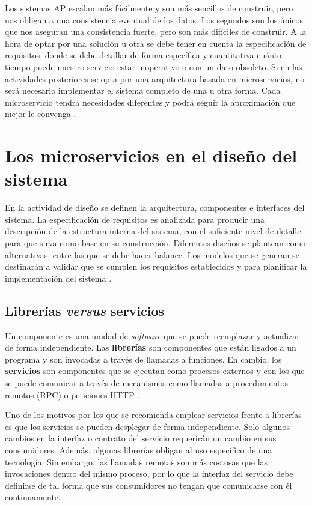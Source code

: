 \documentclass[11pt,spanish,listoffigures]{tfgetsinf}
\begin{document}
Los sistemas AP escalan más fácilmente y son más sencillos de construir, pero nos obligan a una consistencia eventual de los datos. Los segundos son los únicos que nos aseguran una consistencia fuerte, pero son más difíciles de construir. A la hora de optar por una solución u otra se debe tener en cuenta la especificación de requisitos, donde se debe detallar de forma específica y cuantitativa cuánto tiempo puede nuestro servicio estar inoperativo o con un dato obsoleto. Si en las actividades posteriores se opta por una arquitectura basada en microservicios, no será necesario implementar el sistema completo de una u otra forma. Cada microservicio tendrá necesidades diferentes y podrá seguir la aproximación que mejor le convenga \cite{Newman2015a}.

\section{Los microservicios en el diseño del sistema} \label{sct:FaseDiseño}

En la actividad de diseño se definen la arquitectura, componentes e interfaces del sistema. La especificación de requisitos es analizada para producir una descripción de la estructura interna del sistema, con el suficiente nivel de detalle para que sirva como base en su construcción. Diferentes diseños se plantean como alternativas, entre las que se debe hacer balance. Los modelos que se generan se destinarán a validar que se cumplen los requisitos establecidos y para planificar la implementación del sistema \cite{Bourque2014}.

\subsection{Librerías \textit{versus} servicios} \label{subsect:librerias}

Un componente es una unidad de \textit{software} que se puede reemplazar y actualizar de forma independiente. Las \textbf{librerías} son componentes que están ligados a un programa y son invocadas a través de llamadas a funciones. En cambio, los \textbf{servicios} son componentes que se ejecutan como procesos externos y con los que se puede comunicar a través de mecanismos como llamadas a procedimientos remotos (RPC) o peticiones HTTP \cite{Lewis2014}.

Uno de los motivos por los que se recomienda emplear servicios frente a librerías es que los servicios se pueden desplegar de forma independiente. Solo algunos cambios en la interfaz o contrato del servicio requerirán un cambio en sus consumidores. Además, algunas librerías obligan al uso específico de una tecnología. Sin embargo, las llamadas remotas son más costosas que las invocaciones dentro del mismo proceso, por lo que la interfaz del servicio debe definirse de tal forma que sus consumidores no tengan que comunicarse con él continuamente.
\end{document}
